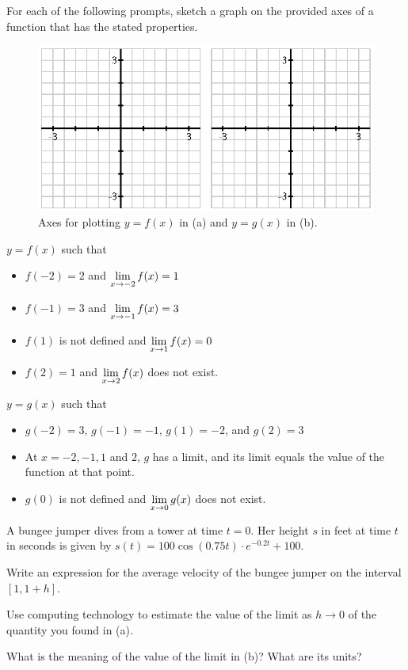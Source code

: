 \begin{exercises}
\item For each of the following prompts, sketch a graph on the provided axes of a function that has the stated properties.
\begin{figure}[h]
  \begin{center}
 \includegraphics{figures/1_2_Ez3.eps} %
   \end{center}
   \caption{Axes for plotting $y = f(x)$ in (a) and $y = g(x)$ in (b).} \label{F:1.2.Ez3}
\end{figure}
  \ba
  	\item $y = f(x)$ such that 
	\begin{itemize}
		\item $f(-2) = 2$ and $\displaystyle \lim_{x \to -2} f(x) = 1$
		\item $f(-1) = 3$ and $\displaystyle \lim_{x \to -1} f(x) = 3$
		\item $f(1)$ is not defined and $\displaystyle \lim_{x \to 1} f(x) = 0$
		\item $f(2) = 1$ and $\displaystyle \lim_{x \to 2} f(x)$ does not exist.
	\end{itemize}
	\item $y = g(x)$ such that
	\begin{itemize}
		\item $g(-2) = 3$, $g(-1) = -1$, $g(1) = -2$, and $g(2) = 3$
		\item At $x = -2, -1, 1$ and $2$, $g$ has a limit, and its limit equals the value of the function at that point.
		\item $g(0)$ is not defined and $\displaystyle \lim_{x \to 0} g(x)$ does not exist.
	\end{itemize}

  \ea

\item A bungee jumper dives from a tower at time $t=0$. Her height  $s$ in feet at time $t$ in seconds is given by $s(t) = 100\cos(0.75t) \cdot e^{-0.2t}+100$.
	\ba
		\item Write an expression for the average velocity of the bungee jumper on the interval \\ $[1,1+h]$.
		\item Use computing technology to estimate the value of the limit as $h \to 0$ of the quantity you found in (a).
		\item What is the meaning of the value of the limit in (b)?  What are its units?
	\ea

\end{exercises}
\afterexercises